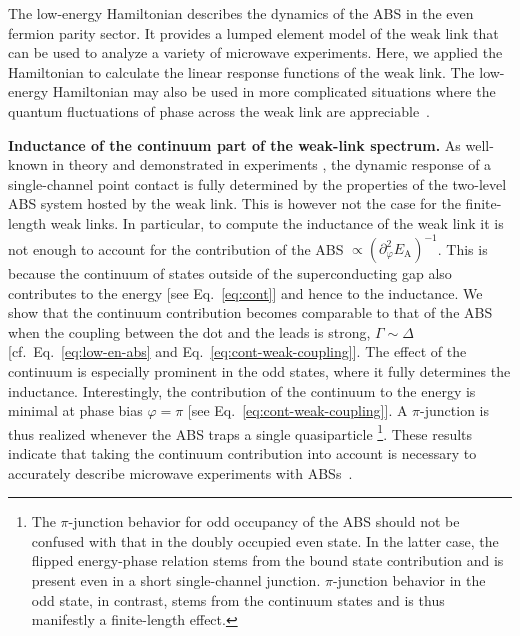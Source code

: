 \documentclass[aps,reprint,longbibliography, prb]{revtex4-2}
\begin{document}
{The low-energy Hamiltonian describes the dynamics of the ABS in the even fermion parity sector. It provides a lumped element model of the weak link that can be used to analyze a variety of microwave experiments. Here, we applied the Hamiltonian to calculate the linear response functions of the weak link. The low-energy Hamiltonian may also be used in more complicated situations where the quantum fluctuations of phase across the weak link are appreciable~\cite{kou2020, marcus2020}.}

\textbf{Inductance of the continuum part of the weak-link spectrum.} As well-known in theory \cite{zazunov2003,feigelman1999,kos2013} and demonstrated in experiments \cite{janvier2015, metzger2021}, the dynamic response of a single-channel point contact is fully determined by the properties of the two-level ABS system hosted by the weak link. This is however not the case for the finite-length weak links. In particular, to compute the inductance of the weak link it is not enough to account for the contribution of the ABS $\propto(\partial^2_\varphi E_\mathrm{A})^{-1}$. This is because the continuum of states outside of the superconducting gap also contributes to the energy [see Eq.~\eqref{eq:cont}] and hence to the inductance. We show that the continuum contribution becomes comparable to that of the ABS when the coupling between the dot and the leads is strong, $\Gamma\sim\Delta$ [cf.~Eq.~\eqref{eq:low-en-abs} and Eq.~\eqref{eq:cont-weak-coupling}]. The effect of the continuum is especially prominent in the odd states, where it fully determines the inductance. Interestingly, the contribution of the continuum to the energy is minimal at phase bias $\varphi = \pi$ [see Eq.~\eqref{eq:cont-weak-coupling}]. A $\pi$-junction is thus realized whenever the ABS traps a single quasiparticle \footnote{The $\pi$-junction behavior for odd occupancy of the ABS should not be confused with that in the doubly occupied even state. In the latter case, the flipped energy-phase relation stems from the bound state contribution and is present even in a short single-channel junction. $\pi$-junction behavior in the odd state, in contrast, stems from the continuum states and is thus manifestly a finite-length effect.}. These results indicate that taking the continuum contribution into account is necessary to accurately describe microwave experiments with ABSs~\cite{fatemi2021}.
\end{document}
